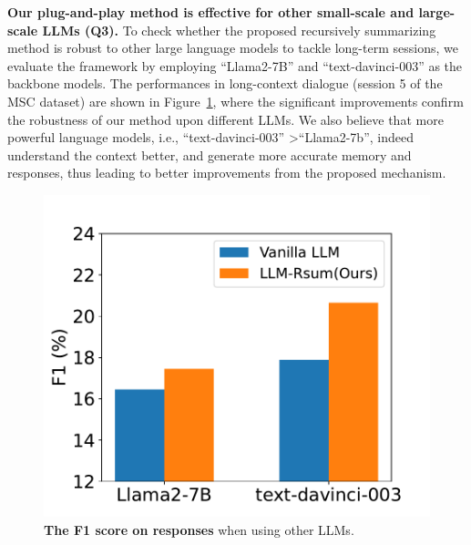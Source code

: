 \documentclass[authoryear,preprint,review,12pt]{elsarticle}
\begin{document}
\textbf{Our plug-and-play method is effective for other small-scale and large-scale LLMs (Q3).} 
To check whether the proposed recursively summarizing method is robust to other large language models to tackle long-term sessions, we evaluate the framework by employing  ``Llama2-7B'' and ``text-davinci-003'' as the backbone models. 
The performances in long-context dialogue (session 5 of the MSC dataset) are shown in Figure~\ref{fig:robust_llm}, where the significant improvements confirm the robustness of our method upon different LLMs. We also believe that more powerful language models, i.e., ``text-davinci-003'' \textgreater ``Llama2-7b'', indeed understand the context better, and generate more accurate memory and responses, thus leading to better improvements from the proposed mechanism.
\begin{figure}[t]
 \centering
 \begin{minipage}[t]{0.46\textwidth}
 \centering
 \includegraphics[scale=0.4]{robust_llm.pdf}
 \caption{\textbf{The F1 score on responses} when using other LLMs.}
 \label{fig:robust_llm}
 \end{minipage}
 \hspace{0.05cm}
 \begin{minipage}[t]{0.46\textwidth}
 \centering

\end{minipage}
\end{figure}
\end{document}
